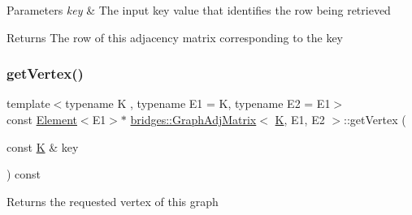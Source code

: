 \begin{DoxyParams}{Parameters}
{\em key} & The input key value that identifies the row being retrieved\\
\hline
\end{DoxyParams}
\begin{DoxyReturn}{Returns}
The row of this adjacency matrix corresponding to the key 
\end{DoxyReturn}
\mbox{\label{classbridges_1_1_graph_adj_matrix_a2c4a30800ec98eab89a23aabf0549869}} 
\subsubsection{\texorpdfstring{getVertex()}{getVertex()}\hspace{0.1cm}{\footnotesize\ttfamily [1/2]}}
{\footnotesize\ttfamily template$<$typename K , typename E1  = K, typename E2  = E1$>$ \\
const \mbox{\hyperlink{classbridges_1_1_element}{Element}}$<$E1$>$$\ast$ \mbox{\hyperlink{classbridges_1_1_graph_adj_matrix}{bridges\+::\+Graph\+Adj\+Matrix}}$<$ \mbox{\hyperlink{namespacebridges_acfb0a4f7877d8f63de3e6862004c50edaa5f3c6a11b03839d46af9fb43c97c188}{K}}, E1, E2 $>$\+::get\+Vertex (\begin{DoxyParamCaption}\item[{const \mbox{\hyperlink{namespacebridges_acfb0a4f7877d8f63de3e6862004c50edaa5f3c6a11b03839d46af9fb43c97c188}{K}} \&}]{key }\end{DoxyParamCaption}) const\hspace{0.3cm}{\ttfamily [inline]}}

\begin{DoxyReturn}{Returns}
the requested vertex of this graph 
\end{DoxyReturn}
\mbox{\label{classbridges_1_1_graph_adj_matrix_a5a565f419080f4aea685a89c98223920}} 
